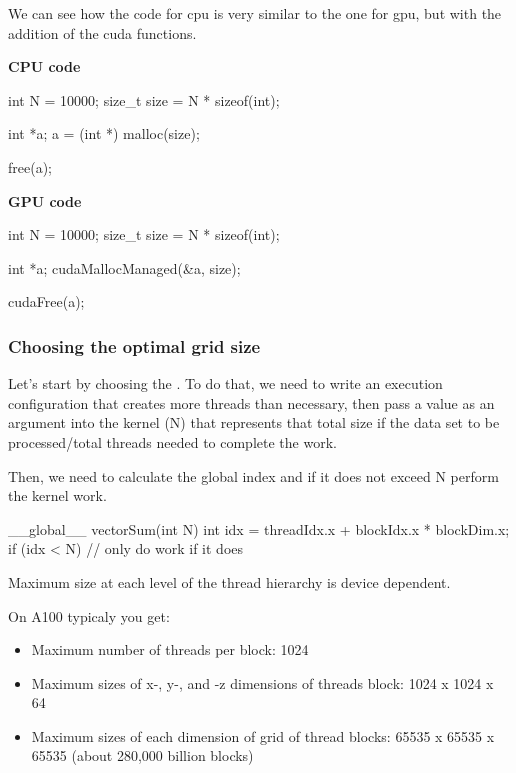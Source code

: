 We can see how the code for cpu is very similar to the one for gpu, but with the addition of the cuda functions.

\begin{minipage}{0.48\textwidth}
\textbf{CPU code}

\begin{codeblock}[language=C]
int N = 10000;
size_t size = N * sizeof(int);

int *a;
a = (int *) malloc(size);

free(a);
\end{codeblock}
\end{minipage}%
\hfill
\begin{minipage}{0.48\textwidth}
\textbf{GPU code}

\begin{codeblock}[language=C]
int N = 10000;
size_t size = N * sizeof(int);

int *a;
cudaMallocManaged(&a, size);

cudaFree(a);
\end{codeblock}
\end{minipage}

\subsubsection{Choosing the optimal grid size}

Let's start by choosing the . To do that, we need to write an execution configuration that creates more threads than necessary, then pass a value as an argument into the kernel (N) that represents that total size if the data set to be processed/total threads needed to complete the work.

Then, we need to calculate the global index and if it does not exceed N perform the kernel work.

\begin{codeblock}[language=C]
__global__ vectorSum(int N) {
    int idx = threadIdx.x + blockIdx.x * blockDim.x;
    if (idx < N) { // only do work if it does}
}
\end{codeblock}

Maximum size at each level of the thread hierarchy is device dependent.

On A100 typicaly you get:

\begin{itemize}
    \item Maximum number of threads per block: 1024
    \item Maximum sizes of x-, y-, and -z dimensions of threads block: 1024 x 1024 x 64
    \item Maximum sizes of each dimension of grid of thread blocks: 65535 x 65535 x 65535 (about 280,000 billion blocks)
\end{itemize}


